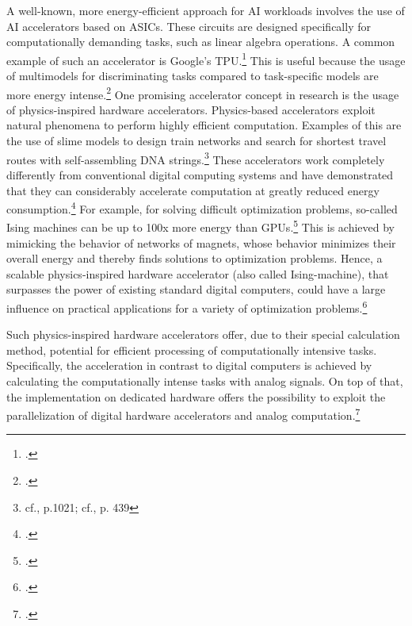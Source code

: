 A well-known, more energy-efficient approach for AI workloads involves the use of AI accelerators based on \ac{ASIC}s.
These circuits are designed specifically for computationally demanding tasks, such as linear algebra operations. A common example of such an accelerator is Google's \ac{TPU}.\footcite[cf.][39]{wittpahlKuenstlicheIntelligenzTechnologie2019} 
This is useful because the usage of multimodels for discriminating tasks compared to
task-specific models are more energy intense.\footcite[cf.][5]{luccioniPowerHungryProcessing2023}
One promising accelerator concept in research is the usage of physics-inspired hardware accelerators.
Physics-based accelerators exploit natural phenomena to perform highly efficient computation.
Examples of this are the use of slime models to design train networks and search for shortest travel routes with self-assembling DNA strings.\footnote{cf.\cite{adlemanMolecularComputationSolutions1994}, p.1021; cf.\cite{teroRulesBiologicallyInspired2010}, p. 439}
These accelerators work completely differently from conventional digital computing systems and have demonstrated that they can considerably accelerate computation at greatly reduced energy consumption.\footcite[cf.][1]{mohseniIsingMachinesHardware2022}
For example, for solving difficult optimization problems, so-called Ising machines can be up to 100x more energy than \ac{GPU}s.\footcite[cf.][409-418]{caiPowerefficientCombinatorialOptimization2020}
This is achieved by mimicking the behavior of networks of magnets, whose behavior minimizes their overall energy and thereby finds solutions to optimization problems.
Hence, a scalable physics-inspired hardware accelerator (also called Ising-machine),
that surpasses the power of existing standard digital computers, could have a large influence
on practical applications for a variety of optimization problems.\footcite[cf.][1]{mohseniIsingMachinesHardware2022}

Such physics-inspired hardware accelerators offer, due to their special calculation method,
potential for efficient processing of computationally intensive tasks. 
Specifically, the acceleration in contrast to digital computers is achieved by calculating
the computationally intense tasks with analog signals.
On top of that, the implementation on dedicated hardware offers the possibility to exploit the parallelization
of digital hardware accelerators and analog computation.\footcite[cf.][4]{mohseniIsingMachinesHardware2022}

